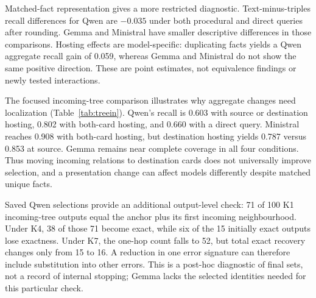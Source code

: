 Matched-fact representation gives a more restricted diagnostic. Text-minus-triples recall differences for Qwen are $-0.035$ under both procedural and direct queries after rounding. Gemma and Ministral have smaller descriptive differences in those comparisons. Hosting effects are model-specific: duplicating facts yields a Qwen aggregate recall gain of 0.059, whereas Gemma and Ministral do not show the same positive direction. These are point estimates, not equivalence findings or newly tested interactions.

\begin{table}[t]
\caption{Mean recall on six-node Tree-in tasks: one model per row, conditions in columns. K1/K3/K4 host triples on source/destination/both cards with a procedural query; K7 uses source cards and a direct query. Each cell retains 100 planned tasks. Ministral has 99 valid outcomes in K3 and 91 in K7; every other cell has 100. Invalid outcomes contribute zero.}
\label{tab:treein}
\centering\small

\end{table}
The focused incoming-tree comparison illustrates why aggregate changes need localization (Table~\ref{tab:treein}). Qwen's recall is 0.603 with source or destination hosting, 0.802 with both-card hosting, and 0.660 with a direct query. Ministral reaches 0.908 with both-card hosting, but destination hosting yields 0.787 versus 0.853 at source. Gemma remains near complete coverage in all four conditions. Thus moving incoming relations to destination cards does not universally improve selection, and a presentation change can affect models differently despite matched unique facts.

Saved Qwen selections provide an additional output-level check: 71 of 100 K1 incoming-tree outputs equal the anchor plus its first incoming neighbourhood. Under K4, 38 of those 71 become exact, while six of the 15 initially exact outputs lose exactness. Under K7, the one-hop count falls to 52, but total exact recovery changes only from 15 to 16. A reduction in one error signature can therefore include substitution into other errors. This is a post-hoc diagnostic of final sets, not a record of internal stopping; Gemma lacks the selected identities needed for this particular check.

